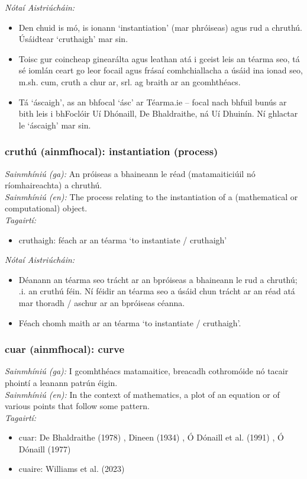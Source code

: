  \noindent \textit{Nótaí Aistriúcháin:}
\begin{itemize}
	\item Den chuid is mó, is ionann `instantiation' (mar phróiseas) agus rud a chruthú. Úsáidtear `cruthaigh' mar sin.
	\item Toisc gur coincheap ginearálta agus leathan atá i gceist leis an téarma seo, tá sé iomlán ceart go leor focail agus frásaí comhchiallacha a úsáid ina ionad seo, m.sh. cum, cruth a chur ar, srl. ag braith ar an gcomhthéacs.
	\item Tá `áscaigh', as an  bhfocal `ásc' ar Téarma.ie -- focal nach bhfuil bunús ar bith leis i bhFoclóir Uí Dhónaill, De Bhaldraithe, ná Uí Dhuinín. Ní ghlactar le `áscaigh' mar sin.
\end{itemize}


\subsubsection*{cruthú (ainmfhocal): instantiation (process)}
 \noindent \textit{Sainmhíniú (ga):} An próiseas a bhaineann le réad (matamaiticiúil nó ríomhaireachta) a chruthú.
\\
 \noindent \textit{Sainmhíniú (en):} The process relating to the instantiation of a (mathematical or computational) object.
\\
 \noindent \textit{Tagairtí:}
\begin{itemize}
	\item cruthaigh: féach ar an téarma `to instantiate / cruthaigh'
\end{itemize}

 \noindent \textit{Nótaí Aistriúcháin:}
\begin{itemize}
	\item Déanann an téarma seo trácht ar an bpróiseas a bhaineann le rud a chruthú; .i. an cruthú féin. Ní féidir an téarma seo a úsáid chun trácht ar an réad atá mar thoradh / aschur ar an bpróiseas céanna.
	\item Féach chomh maith ar an téarma `to instantiate / cruthaigh'.
\end{itemize}


\subsubsection*{cuar (ainmfhocal): curve}
 \noindent \textit{Sainmhíniú (ga):} I gcomhthéacs matamaitice, breacadh cothromóide nó tacair phointí a leanann patrún éigin.
\\
 \noindent \textit{Sainmhíniú (en):} In the context of mathematics, a plot of an equation or of various points that follow some pattern.
\\
 \noindent \textit{Tagairtí:}
\begin{itemize}
	\item cuar: De Bhaldraithe (1978) \cite{de-bhaldraithe}, Dineen (1934) \cite{dineen}, Ó Dónaill et al. (1991) \cite{focloir-beag}, Ó Dónaill (1977) \cite{odonaill}
	\item cuaire: Williams et al. (2023) \cite{storchiste}
\end{itemize}

